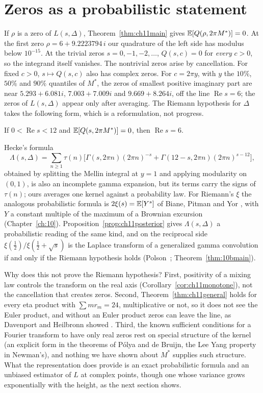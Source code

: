 \section{Zeros as a probabilistic statement}

If $\rho$ is a zero of $L(s,\Delta)$, Theorem~\ref{thm:ch11main} gives $\mathbb{E}[Q(\rho,2\pi M^*)]=0$. At the first zero $\rho=6+9.2223794\,i$ our quadrature of the left side has modulus below $10^{-15}$. At the trivial zeros $s=0,-1,-2,\ldots$, $Q(s,c)=0$ for \emph{every} $c>0$, so the integrand itself vanishes. The nontrivial zeros arise by cancellation. For fixed $c>0$, $s\mapsto Q(s,c)$ also has complex zeros. For $c=2\pi y$, with $y$ the $10\%$, $50\%$ and $90\%$ quantiles of $M^*$, the zeros of smallest positive imaginary part are near $5.293+6.081i$, $7.003+7.009i$ and $9.669+8.264i$, off the line $\operatorname{Re}s=6$; the zeros of $L(s,\Delta)$ appear only after averaging. The Riemann hypothesis for $\Delta$ takes the following form, which is a reformulation, not progress.

\begin{conjecture}\label{conj:ch11rh}
If $0<\operatorname{Re}s<12$ and $\mathbb{E}[Q(s,2\pi M^*)]=0$, then $\operatorname{Re}s=6$.
\end{conjecture}

Hecke's formula
\[
\Lambda(s,\Delta)=\sum_{n\ge1}\tau(n)\bigl[\Gamma(s,2\pi n)(2\pi n)^{-s}+\Gamma(12-s,2\pi n)(2\pi n)^{s-12}\bigr],
\]
obtained by splitting the Mellin integral at $y=1$ and applying modularity on $(0,1)$, is also an incomplete gamma expansion, but its terms carry the signs of $\tau(n)$; ours averages one kernel against a probability law. For Riemann's $\xi$ the analogous probabilistic formula is $2\xi(s)=\mathbb{E}[Y^s]$ of Biane, Pitman and Yor \cite{bpy2001}, with $Y$ a constant multiple of the maximum of a Brownian excursion (Chapter~\ref{ch:10}). Proposition~\ref{prop:ch11posterior} gives $\Lambda(s,\Delta)$ a probabilistic reading of the same kind, and on the reciprocal side $\xi(\frac12)/\xi(\frac12+\sqrt s)$ is the Laplace transform of a generalized gamma convolution if and only if the Riemann hypothesis holds (Polson~\cite{polson2017}; Theorem~\ref{thm:10bmain}).

Why does this not prove the Riemann hypothesis? First, positivity of a mixing law controls the transform on the real axis (Corollary~\ref{cor:ch11monotone}), not the cancellation that creates zeros. Second, Theorem~\ref{thm:ch11general} holds for every eta product with $\sum mr_m=24$, multiplicative or not, so it does not see the Euler product, and without an Euler product zeros can leave the line, as Davenport and Heilbronn showed \cite{davenportheilbronn1936}. Third, the known sufficient conditions for a Fourier transform to have only real zeros \cite{polya1926,debruijn1950,newman1976} rest on special structure of the kernel (an explicit form in the theorems of P\'olya and de Bruijn, the Lee Yang property in Newman's), and nothing we have shown about $M^*$ supplies such structure. What the representation does provide is an exact probabilistic formula and an unbiased estimator of $L$ at complex points, though one whose variance grows exponentially with the height, as the next section shows.

